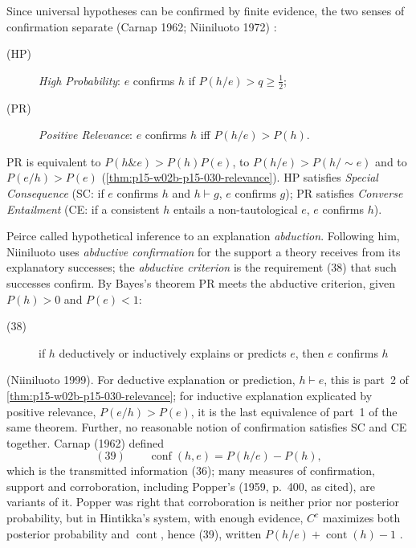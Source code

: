 Since universal hypotheses can be confirmed by finite evidence, the two
senses of confirmation separate (Carnap 1962; Niiniluoto 1972)
\cite[p.~332]{Niiniluoto2011HintikkaProgramReading}:
\begin{description}
\item[(HP)] \emph{High Probability}: \(e\) confirms \(h\) if
  \(P(h/e)>q\geq\tfrac12\);
\item[(PR)] \emph{Positive Relevance}: \(e\) confirms \(h\) iff
  \(P(h/e)>P(h)\).
\end{description}
PR is equivalent to \(P(h\&e)>P(h)P(e)\), to \(P(h/e)>P(h/\sim e)\) and to
\(P(e/h)>P(e)\) (\cref{thm:p15-w02b-p15-030-relevance}). HP satisfies
\emph{Special Consequence} (SC: if \(e\) confirms \(h\) and \(h\vdash g\),
\(e\) confirms \(g\)); PR satisfies \emph{Converse Entailment} (CE: if a
consistent \(h\) entails a non-tautological \(e\), \(e\) confirms \(h\)).

Peirce called hypothetical inference to an explanation
\emph{abduction}. Following him, Niiniluoto uses \emph{abductive
confirmation} for the support a theory receives from its
explanatory successes; the \emph{abductive criterion} is the requirement
(38) that such successes confirm. By Bayes's theorem PR meets the
abductive criterion, given \(P(h)>0\) and \(P(e)<1\):
\begin{description}
\item[(38)] if \(h\) deductively or inductively explains or predicts \(e\),
  then \(e\) confirms \(h\)
\end{description}
(Niiniluoto 1999). For deductive explanation or prediction, \(h\vdash e\),
this is part~2 of \cref{thm:p15-w02b-p15-030-relevance}; for inductive
explanation explicated by positive relevance, \(P(e/h)>P(e)\), it is the
last equivalence of part~1 of the same theorem. Further, no reasonable
notion of confirmation satisfies SC and CE together. Carnap (1962)
defined
\[
 (39)\qquad \operatorname{conf}(h,e)=P(h/e)-P(h),
\]
which is the transmitted information (36); many measures of confirmation,
support and corroboration, including Popper's (1959, p.~400, as cited),
are variants of it. Popper was right that corroboration is neither prior
nor posterior probability, but in Hintikka's system, with enough
evidence, \(C^c\) maximizes both posterior probability and
\(\operatorname{cont}\), hence (39), written \(P(h/e)+\operatorname{cont}(h)-1\)
\cite[p.~332]{Niiniluoto2011HintikkaProgramReading}.

